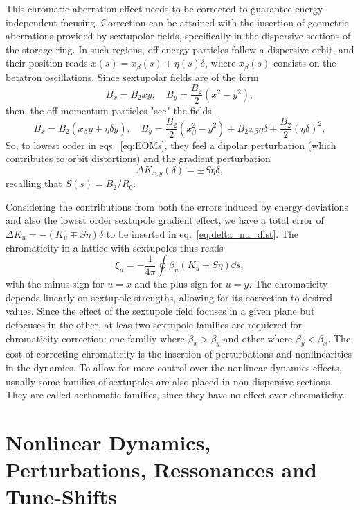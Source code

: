 This chromatic aberration effect needs to be corrected to guarantee energy-independent focusing. Correction can be attained with the insertion of geometric aberrations provided by sextupolar fields, specifically in the dispersive sections of the storage ring. In such regions, off-energy particles follow a dispersive orbit, and their position reads $x(s)=x_{\beta}(s)+\eta(s) \delta$, where $x_{\beta}(s)$ consists on the betatron oscillations. Since sextupolar fields are of the form
$$B_{x}=B_{2} x y, \quad B_{y}= \frac{B_{2}}{2}(x^{2}-y^{2}),$$
then, the off-momentum particles "see" the fields
$$B_{x}=B_{2}(x_\beta y + \eta \delta y), \quad B_{y}=\frac{B_{2}}{2}({x_\beta^{2}-y^{2}})+B_2 x_\beta \eta \delta + \frac{B_2}{2}(\eta \delta)^2,$$
So, to lowest order in eqs.~\eqref{eq:EOMs}, they feel a dipolar perturbation (which contributes to orbit distortions) and the gradient perturbation
$$\Delta K_{x,y}(\delta)=\pm S\eta \delta,$$
recalling that $S(s) = B_2 / R_0$.

Considering the contributions from both the errors induced by energy deviations and also the lowest order sextupole gradient effect, we have a total error of $\Delta K_u = -(K_u \mp S\eta)\delta$ to be inserted in eq.~\eqref{eq:delta_nu_dist}. The chromaticity in a lattice with sextupoles thus reads
\begin{equation}
    \xi_{u}=-\frac{1}{4\pi}\oint\beta_{u}(K_{u}\mp S\eta)\dd{s},
    \label{eq:chromaticity}
\end{equation}
with the minus sign for $u=x$ and the plus sign for $u=y$. The chromaticity depends linearly on sextupole strengths, allowing for its correction to desired values. Since the effect of the sextupole field focuses in a given plane but defocuses in the other, at leas two sextupole families are requiered for chromaticity correction: one familiy where $\beta_x > \beta_y$ and other where $\beta_y < \beta_x$. The cost of correcting chromaticity is the insertion of perturbations and nonlinearities in the dynamics. To allow for more control over the nonlinear dynamics effects, usually some families of sextupoles are also placed in non-dispersive sections. They are called acrhomatic families, since they have no effect over chromaticity.

\section{Nonlinear Dynamics, Perturbations, Ressonances and Tune-Shifts}

